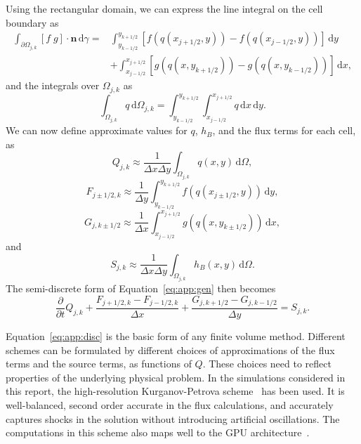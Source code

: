 \documentclass[11pt, a4paper]{article}
\newcommand{\drm}[0]{\,\mathrm{d}}
\newcommand{\vecn}[0]{\bm{n}}
\newcommand{\partder}[2]{\frac{\partial #1}{\partial #2}}
\begin{document}
Using the rectangular domain, we can express the line integral on the cell boundary as 
\begin{equation*}
	\begin{split}
		\int_{\partial \Omega_{j,k}} [f \; g] \cdot \vecn \drm \gamma = &\int_{y_{k-1/2}}^{y_{k+1/2}} \left[ f( q( x_{j+1/2}, y)) - f(q(x_{j-1/2}, y)) \right] \drm y \\
			&+ \int_{x_{j-1/2}}^{x_{j+1/2}} \left[ g(q(x, y_{k+1/2})) - g(q(x,y_{k-1/2})) \right] \drm x,
	\end{split}
\end{equation*}
and the integrals over $\Omega_{j,k}$ as
\begin{equation*}
	\int_{\Omega_{j,k}} q \drm \Omega_{j,k} = \int_{y_{k-1/2}}^{y_{k+1/2}} \int_{x_{j-1/2}}^{x_{j+1/2}} q \drm x \drm y.
\end{equation*}	
We can now define approximate values for $q$, $h_B$, and the flux terms for each cell, as
\begin{equation*}
	Q_{j,k} \approx \frac{1}{\Delta x \Delta y} \int_{\Omega_{j,k}} q(x,y) \drm\Omega,
\end{equation*}
\begin{equation*}
	F_{j\pm1/2, k} \approx \frac{1}{\Delta y} \int_{y_{k-1/2}}^{y_{k+1/2}} f(q(x_{j \pm 1/2}, y)) \drm y,
\end{equation*}
\begin{equation*}
	G_{j,k \pm 1/2} \approx \frac{1}{\Delta x} \int_{x_{j-1/2}}^{x_{j+1/2}} g(q( x, y_{k \pm 1/2})) \drm x,
\end{equation*}
and
\begin{equation*}
	S_{j,k} \approx \frac{1}{\Delta x \Delta y} \int_{\Omega_{j,k}} h_B(x,y) \drm \Omega.
\end{equation*}
The semi-discrete form of Equation~\eqref{eq:app:gen} then becomes
\begin{equation}
	\partder{}{t} Q_{j,k} +  \frac{F_{j+1/2, k} - F_{j-1/2,k}}{\Delta x}  + \frac{G_{j, k+1/2}  - G_{j, k-1/2}}{\Delta y} = S_{j,k}.
	\label{eq:app:disc}
\end{equation}

Equation~\eqref{eq:app:disc} is the basic form of any finite volume method.
Different schemes can be formulated by different choices of approximations of the flux terms and the source terms, as functions of $Q$.
These choices need to reflect properties of the underlying physical problem.
In the simulations considered in this report, the high-resolution Kurganov-Petrova scheme~\cite{kurganovPetrova2007} has been used.
It is well-balanced, second order accurate in the flux calculations, and accurately captures shocks in the solution without introducing artificial oscillations.
The computations in this scheme also maps well to the GPU architecture~\cite{brodtkorb_etal_10_cvs, brodtkorb_etal_11_caf}.
\end{document}
